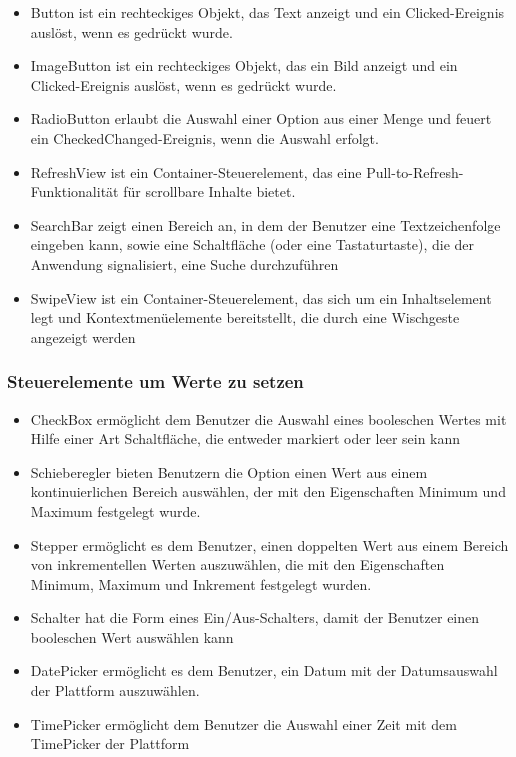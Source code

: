 \begin{itemize}
\setlength\itemsep{-0.6em}
 \item Button ist ein rechteckiges Objekt, das Text anzeigt und ein Clicked-Ereignis auslöst, wenn es gedrückt wurde.
 \item ImageButton ist ein rechteckiges Objekt, das ein Bild anzeigt und ein Clicked-Ereignis auslöst, wenn es gedrückt wurde.
  \item RadioButton erlaubt die Auswahl einer Option aus einer Menge und feuert ein CheckedChanged-Ereignis, wenn die Auswahl erfolgt.
 \item RefreshView ist ein Container-Steuerelement, das eine Pull-to-Refresh-Funktionalität für scrollbare Inhalte bietet. 
 \item SearchBar zeigt einen Bereich an, in dem der Benutzer eine Textzeichenfolge eingeben kann, sowie eine Schaltfläche (oder eine Tastaturtaste), die der Anwendung signalisiert, eine Suche durchzuführen
 \item SwipeView ist ein Container-Steuerelement, das sich um ein Inhaltselement legt und Kontextmenüelemente bereitstellt, die durch eine Wischgeste angezeigt werden
\end{itemize}



\subsubsection{Steuerelemente um Werte zu setzen}


\begin{itemize}
\setlength\itemsep{-0.6em}
 \item CheckBox ermöglicht dem Benutzer die Auswahl eines booleschen Wertes mit Hilfe einer Art Schaltfläche, die entweder markiert oder leer sein kann
 \item Schieberegler bieten Benutzern die Option einen  Wert aus einem kontinuierlichen Bereich auswählen, der mit den Eigenschaften Minimum und Maximum festgelegt wurde.
 \item Stepper ermöglicht es dem Benutzer, einen doppelten Wert aus einem Bereich von inkrementellen Werten auszuwählen, die mit den Eigenschaften Minimum, Maximum und Inkrement festgelegt wurden.
 \item Schalter hat die Form eines Ein/Aus-Schalters, damit der Benutzer einen booleschen Wert auswählen kann
 \item DatePicker ermöglicht es dem Benutzer, ein Datum mit der Datumsauswahl der Plattform auszuwählen.
 \item TimePicker ermöglicht dem Benutzer die Auswahl einer Zeit mit dem TimePicker der Plattform
\end{itemize}

